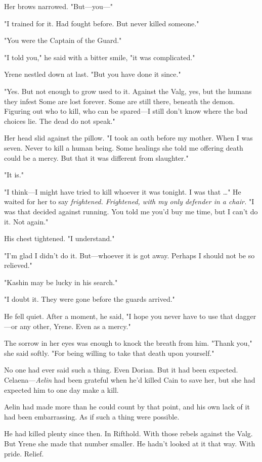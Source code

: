 Her brows narrowed. "But---you---"

"I trained for it. Had fought before. But never killed someone."

"You were the Captain of the Guard."

"I told you," he said with a bitter smile, "it was complicated."

Yrene nestled down at last. "But you have done it since."

"Yes. But not enough to grow used to it. Against the Valg, yes, but the humans they infest  Some are lost forever. Some are still there, beneath the demon. Figuring out who to kill, who can be spared---I still don't know where the bad choices lie. The dead do not speak."

Her head slid against the pillow. "I took an oath before my mother. When I was seven. Never to kill a human being. Some healings 
she told me offering death could be a mercy. But that it was different from slaughter."

"It is."

"I think---I might have tried to kill whoever it was tonight. I was that \ldots" He waited for her to say \emph{frightened. Frightened, with my only defender in a chair.} "I was that decided against running. You told me you'd buy me time, but  I can't do it. Not again."

His chest tightened. "I understand."

"I'm glad I didn't do it. But---whoever it is got away. Perhaps I should not be so relieved."

"Kashin may be lucky in his search."

"I doubt it. They were gone before the guards arrived."

He fell quiet. After a moment, he said, "I hope you never have to use that dagger---or any other, Yrene. Even as a mercy."

The sorrow in her eyes was enough to knock the breath from him. "Thank you," she said softly. "For being willing to take that death upon yourself."

No one had ever said such a thing. Even Dorian. But it had been expected. Celaena---\emph{Aelin} had been grateful when he'd killed Cain to save her, but she had expected him to one day make a kill.

Aelin had made more than he could count by that point, and his own lack of it had been  embarrassing. As if such a thing were possible.

He had killed plenty since then. In Rifthold. With those rebels against the Valg. But Yrene  she made that number smaller. He hadn't looked at it that way. With pride. Relief.

